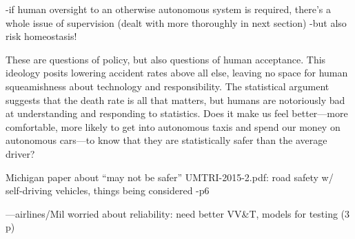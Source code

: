 -if human oversight to an otherwise autonomous system is required,
there's a whole issue of supervision (dealt with more thoroughly in
next section)
-but also risk homeostasis!

These are questions of policy, but also questions of human acceptance.
This ideology posits lowering accident rates above all else, leaving
no space for human squeamishness about technology and responsibility. 
The statistical argument suggests that the death rate is all that
matters, but humans are notoriously bad at understanding and
responding to statistics. Does it make us feel better---more
comfortable, more likely to get into autonomous taxis and spend our
money on autonomous cars---to know that they are statistically safer
than the average driver? 

Michigan paper about ``may not be safer''
UMTRI-2015-2.pdf: road safety w/ self-driving vehicles, things being
considered
-p6

---airlines/Mil worried about reliability: need better VV\&T, models
for testing (3 p)

